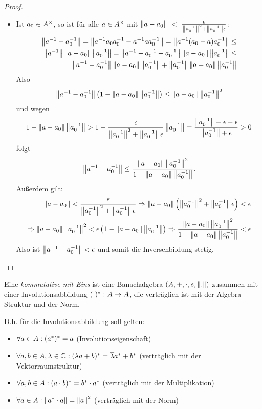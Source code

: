 \begin{proof}
\begin{itemize}
\item Ist $a_0 \in A^\times$, so ist für alle $a \in A^\times$ mit $\left\lVert a-a_0\right\rVert~<~\frac{\epsilon}{\left\lVert a_0^{-1}\right\rVert^2+\left\lVert a_0^{-1}\right\rVert\epsilon}$:
	\begin{align*}
	\left\lVert a^{-1}-a_0^{-1}\right\rVert = \left\lVert a^{-1}a_0a_0^{-1}-a^{-1}aa_0^{-1}\right\rVert = \left\lVert a^{-1}(a_0-a)a_0^{-1}\right\rVert \leq \\
	\left\lVert a^{-1}\right\rVert\left\lVert a-a_0\right\rVert\left\lVert a_0^{-1}\right\rVert = \left\lVert a^{-1}-a_0^{-1}+a_0^{-1}\right\rVert\left\lVert a-a_0\right\rVert\left\lVert a_0^{-1}\right\rVert \leq \\
	\left\lVert a^{-1}-a_0^{-1}\right\rVert\left\lVert a-a_0\right\rVert\left\lVert a_0^{-1}\right\rVert + \left\lVert a_0^{-1}\right\rVert\left\lVert a-a_0\right\rVert\left\lVert a_0^{-1}\right\rVert
	\end{align*}
Also
	\[\left\lVert a^{-1}-a_0^{-1}\right\rVert\left(1 - \left\lVert a-a_0\right\rVert\left\lVert a_0^{-1}\right\rVert\right) \leq \left\lVert a-a_0\right\rVert\left\lVert a_0^{-1}\right\rVert^2\]
und wegen
	\[1-\left\lVert a-a_0\right\rVert\left\lVert a_0^{-1}\right\rVert > 1 - \frac{\epsilon}{\left\lVert a_0^{-1}\right\rVert^2+\left\lVert a_0^{-1}\right\rVert\epsilon} \left\lVert a_0^{-1}\right\rVert = \frac{\left\lVert a_0^{-1}\right\rVert + \epsilon - \epsilon}{\left\lVert a_0^{-1}\right\rVert+\epsilon} > 0\]
folgt
	\[\left\lVert a^{-1}-a_0^{-1}\right\rVert \leq \frac{\left\lVert a-a_0\right\rVert\left\lVert a_0^{-1}\right\rVert^2}{1 - \left\lVert a-a_0\right\rVert\left\lVert a_0^{-1}\right\rVert}.\]
Außerdem gilt:
	\begin{align*}
	\left\lVert a-a_0\right\rVert < \frac{\epsilon}{\left\lVert a_0^{-1}\right\rVert^2+\left\lVert a_0^{-1}\right\rVert\epsilon} 
	\Rightarrow \left\lVert a-a_0\right\rVert\left(\left\lVert a_0^{-1}\right\rVert^2+\left\lVert a_0^{-1}\right\rVert\epsilon\right) < \epsilon \\ 
	\Rightarrow \left\lVert a-a_0\right\rVert\left\lVert a_0^{-1}\right\rVert^2 < \epsilon\left(1-\left\lVert a-a_0\right\rVert\left\lVert a_0^{-1}\right\rVert\right) 
	\Rightarrow \frac{\left\lVert a-a_0\right\rVert\left\lVert a_0^{-1}\right\rVert^2}{1-\left\lVert a-a_0\right\rVert\left\lVert a_0^{-1}\right\rVert} < \epsilon
	\end{align*}
Also ist $\left\lVert a^{-1}-a_0^{-1}\right\rVert< \epsilon$ und somit die Inversenbildung stetig.

\end{itemize}
\end{proof}

\begin{defn}[C*-Algebra]
Eine \emph{kommutative \CAlg{} mit Eins} ist eine Banachalgebra $(A, +, \cdot, e, \left\lVert.\right\rVert)$ zusammen mit einer Involutionsabbildung $(~)^*:A \to A$, die verträglich ist mit der Algebra-Struktur und der Norm.

D.h. für die Involutionsabbildung soll gelten:
\begin{itemize}
	\item $\forall a  \in A: (a^*)^* = a$ (Involutionseigenschaft)
	\item $\forall a,b \in A, \lambda \in \mathbb{C}: (\lambda a + b)^* = \overline{\lambda}a^* + b^*$ (verträglich mit der  Vektorraumstruktur)
	\item $\forall a,b \in A: (a\cdot b)^* = b^*\cdot a^*$ (verträglich mit der Multiplikation)
	\item $\forall a \in A: \left\lVert a^*\cdot a\right\rVert = \left\lVert a\right\rVert^2$ (verträglich mit der Norm)
\end{itemize}
\end{defn}

